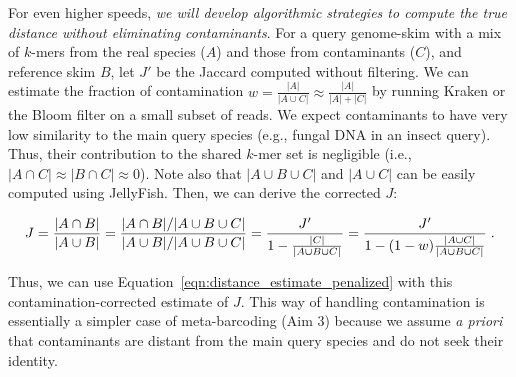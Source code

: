 For even higher speeds, {\em we will develop algorithmic strategies to compute the true distance  without eliminating contaminants}. 
For a query genome-skim with a mix
of $k$-mers from the real species  ($A$)
and those from contaminants ($C$), and reference skim $B$,
let $J'$ be the Jaccard computed
without filtering.
We can estimate the fraction of contamination $w=\frac{|A|}{|A\cup C|}\approx\frac{|A|}{|A|+|C|}$
by running Kraken or
the Bloom filter  on a small subset of reads.
We expect contaminants to have very low similarity to the main query species (e.g., fungal DNA in an insect query). Thus, 
their contribution to the shared $k$-mer set is negligible (i.e.,
$|A\cap C|\approx |B\cap C|\approx 0$). 
Note also that $|A\cup B \cup C|$ and $|A\cup C|$ can be easily computed using JellyFish.
Then, we can derive
the corrected $J$:
\vspace{-6pt}
\begin{small}
$$J=\frac{|A\cap B|}{|A\cup B|}=\frac{|A\cap B|/{|A\cup B \cup C|}}{|A\cup B|/|A\cup B \cup C|}=\frac{J'}{1-\frac{|C|}{|A\cup B \cup C|}}=\frac{J'}{1-(1-w)\frac{|A\cup C|}{|A\cup B \cup C|}}\; .
\vspace{-3pt}
$$
\end{small}
Thus, we can use Equation~\ref{eqn:distance_estimate_penalized} with
this contamination-corrected estimate of $J$.
This way of handling contamination 
is essentially a simpler case of meta-barcoding (Aim 3)
because we  assume {\em a priori} that contaminants
are distant from the main query species
and do not seek their identity. 



\vspace{-5pt}
